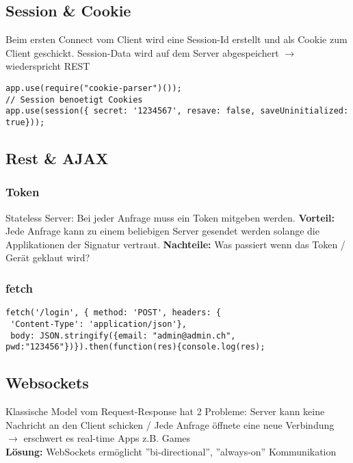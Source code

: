 \subsection{Session \& Cookie}
Beim ersten Connect vom Client wird eine Session-Id erstellt und als Cookie zum Client geschickt. Session-Data wird auf dem Server abgespeichert $\rightarrow$ wiederspricht REST
\begin{lstlisting}
app.use(require("cookie-parser")());
// Session benoetigt Cookies
app.use(session({ secret: '1234567', resave: false, saveUninitialized: true}));
\end{lstlisting}



\subsection{Rest \& AJAX}
\subsubsection{Token}
Stateless Server: Bei jeder Anfrage muss ein Token mitgeben werden.
\textbf{Vorteil:} Jede Anfrage kann zu einem beliebigen Server gesendet werden solange die Applikationen der Signatur vertraut. \textbf{Nachteile:} Was passiert wenn das Token / Gerät geklaut wird?


\subsubsection{fetch}
\begin{lstlisting}
fetch('/login', { method: 'POST', headers: {
 'Content-Type': 'application/json'},
 body: JSON.stringify({email: "admin@admin.ch",
pwd:"123456"})}).then(function(res){console.log(res);
\end{lstlisting}


\subsection{Websockets}
Klassische Model vom Request-Response hat 2 Probleme:
Server kann keine Nachricht an den Client schicken /
Jede Anfrage öffnete eine neue Verbindung $\rightarrow$ erschwert es real-time Apps z.B. Games\\
\textbf{Lösung:} WebSockets ermöglicht ''bi-directional'', ''always-on'' Kommunikation

\vfill
$ $ 
\columnbreak